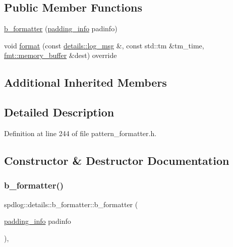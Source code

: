 \subsection*{Public Member Functions}
\begin{DoxyCompactItemize}
\item 
\hyperlink{classspdlog_1_1details_1_1b__formatter_a08418409ea0e59ea9b79d27974e30824}{b\+\_\+formatter} (\hyperlink{structspdlog_1_1details_1_1padding__info}{padding\+\_\+info} padinfo)
\item 
void \hyperlink{classspdlog_1_1details_1_1b__formatter_a3943edd9e27eb217e4871abf06b91df5}{format} (const \hyperlink{structspdlog_1_1details_1_1log__msg}{details\+::log\+\_\+msg} \&, const std\+::tm \&tm\+\_\+time, \hyperlink{format_8h_a21cbf729f69302f578e6db21c5e9e0d2}{fmt\+::memory\+\_\+buffer} \&dest) override
\end{DoxyCompactItemize}
\subsection*{Additional Inherited Members}


\subsection{Detailed Description}


Definition at line 244 of file pattern\+\_\+formatter.\+h.



\subsection{Constructor \& Destructor Documentation}
\mbox{\label{classspdlog_1_1details_1_1b__formatter_a08418409ea0e59ea9b79d27974e30824}} 
\subsubsection{\texorpdfstring{b\+\_\+formatter()}{b\_formatter()}}
{\footnotesize\ttfamily spdlog\+::details\+::b\+\_\+formatter\+::b\+\_\+formatter (\begin{DoxyParamCaption}\item[{\hyperlink{structspdlog_1_1details_1_1padding__info}{padding\+\_\+info}}]{padinfo }\end{DoxyParamCaption})\hspace{0.3cm}{\ttfamily [inline]}, {\ttfamily [explicit]}}



